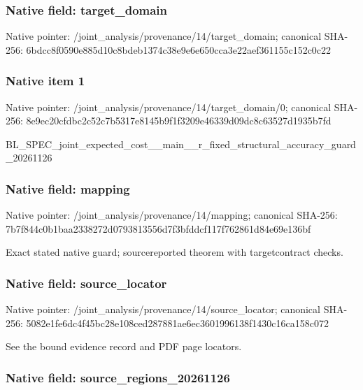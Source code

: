 \documentclass[10pt,a4paper]{article}
\begin{document}
\subsubsection{Native field: target\_domain}


Native pointer: /joint\_analysis/provenan\allowbreak{}ce/14/target\_domain; canonical SHA-256: 6bdcc8f0590e885d10c8bdeb\allowbreak{}1374c38e9e6e650cca3e22ae\allowbreak{}f361155c152c0c22



\subsubsection{Native item 1}


Native pointer: /joint\_analysis/provenan\allowbreak{}ce/14/target\_domain/0; canonical SHA-256: 8e9ec20cfdbc2c52c7b5317e\allowbreak{}8145b9f1f3209e46339d09dc\allowbreak{}8c63527d1935b7fd


BL\_SPEC\_joint\_expected\_c\allowbreak{}ost\_\_main\_\_r\_fixed\_struc\allowbreak{}tural\_accuracy\_guard\_202\allowbreak{}61126


\subsubsection{Native field: mapping}


Native pointer: /joint\_analysis/provenance/14/mapping; canonical SHA-256: 7b7f844c0b1baa2338272d07\allowbreak{}93813556d7f3bfddcf117f76\allowbreak{}2861d84e69e136bf


Exact stated native guard; sourcereported theorem with targetcontract checks.


\subsubsection{Native field: source\_locator}


Native pointer: /joint\_analysis/provenan\allowbreak{}ce/14/source\_locator; canonical SHA-256: 5082e1fe6dc4f45bc28e108c\allowbreak{}ed287881ae6ec3601996138f\allowbreak{}1430c16ca158c072


See the bound evidence record and PDF page locators.


\subsubsection{Native field: source\_regions\_20261126}
\end{document}
